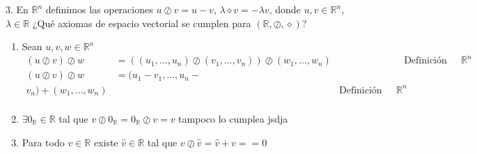 \documentclass[20pt]{report}
\newcommand{\+}{\oslash}
\renewcommand{\*}{\diamond}
\newcommand{\R}{\mathds{R}}
\theoremstyle{definition}
\begin{document}
	
	3. En $ \R^n $ definimos las operaciones $ u\+ v = u - v$, $ \lambda \* v = -\lambda v $, donde $ u,v \in \R^n $, $ \lambda \in \R $
	¿Qué axiomas de espacio vectorial se cumplen para $ (\R, \+, \*) $? 
	
	\begin{enumerate}
		\item Sean $ u,v,w \in \R^n $
		\begin{align*}
			(u \+ v) \+ w &= ((u_1, \dots, u_n) \+ (v_1, \dots, v_n)) \+ (w_1, \dots, w_n) &&\text{Definición porque están en }\R^n\\
			(u \+ v) \+ w &= (u_1 - v_1, \dots, u_n -\\
			 v_n) + (w_1, \dots, w_n) &&\text{Definición porque están en }\R^n\\
		\end{align*}
		\item $ \exists 0_\R \in \R $ tal que $ v \+ 0_\R = 0_\R \+ v = v $
		tampoco lo cumplea jsdja
		\item Para todo $ v \in \R $ existe $ \hat{v} \in \R $ tal que $ v \+ \hat{v} = \hat{v} + v = =0 $
	\end{enumerate}
\end{document}

